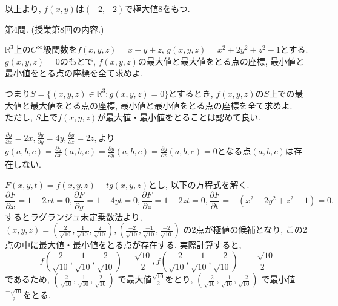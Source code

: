 \documentclass[dvipdfmx,a4paper,11pt]{article}
\newcommand{\R}{\mathbb{R}}
\theoremstyle{definition}
\newcommand{\pdrv}[2]{\frac{\partial #1}{\partial #2}}
\begin{document}
以上より,  $f(x,y)$は$(-2,-2)$で極大値$8$をもつ.
   
       \vspace{33pt}
{\Large 第4問.} (授業第8回の内容.)
    \vspace{11pt}

$\R^3$上の$C^{\infty}$級関数を$f(x,y,z) = x+y+z$, $g(x,y,z) = x^2+2y^2+z^{2}-1$とする. \\ 
$g(x,y,z)=0$のもとで, $f(x,y,z)$の最大値と最大値をとる点の座標, 最小値と最小値をとる点の座標を全て求めよ. \\

    \vspace{-11pt}
    
つまり$S = \{ (x,y,z) \in \R^3: g(x,y,z)=0\}$とするとき, 
$f(x,y,z)$の$S$上での最大値と最大値をとる点の座標, 最小値と最小値をとる点の座標を全て求めよ.　\\

   \vspace{-11pt}
 ただし, $S$上で$f(x,y,z)$が最大値・最小値をとることは認めて良い.
 
  \vspace{11pt}
 
\hspace{-11pt}{\Large $\bullet$ 第4問解答例}
  
 $\pdrv{g}{x}=2x, \pdrv{g}{y}=4y, \pdrv{g}{z}=2z, $より
 $g(a,b,c)=\pdrv{g}{x}(a,b,c)=\pdrv{g}{y}(a,b,c)=\pdrv{g}{z}(a,b,c)=0$となる点$(a,b,c)$は存在しない.
   
$F(x,y,t) = f(x,y,z)-tg(x,y,z)$とし, 以下の方程式を解く.
$$
\pdrv{F}{x} = 1-2xt=0,
\pdrv{F}{y}= 1-4yt =0,
\pdrv{F}{z}=1-2zt=0,
\pdrv{F}{t} =-(x^2+2y^2+z^2-1)=0.
$$ 
するとラグランジュ未定乗数法より, 
$(x,y,z) =(\frac{2}{\sqrt{10}} ,  \frac{1}{\sqrt{10}} ,\frac{2}{\sqrt{10}}  ), 
(\frac{-2}{\sqrt{10}} ,  \frac{-1}{\sqrt{10}} ,\frac{-2}{\sqrt{10}}  )$
の2点が極値の候補となり, 
この2点の中に最大値・最小値をとる点が存在する.
実際計算すると, 
$$
f(\frac{2}{\sqrt{10}} ,  \frac{1}{\sqrt{10}} ,\frac{2}{\sqrt{10}}  )=\frac{\sqrt{10}}{2}, 
f(\frac{-2}{\sqrt{10}} ,  \frac{-1}{\sqrt{10}} ,\frac{-2}{\sqrt{10}}  )=\frac{-\sqrt{10}}{2}
$$
であるため, 
$
(\frac{2}{\sqrt{10}} ,  \frac{1}{\sqrt{10}} ,\frac{2}{\sqrt{10}})$
で最大値$\frac{\sqrt{10}}{2}$をとり, 
$
(\frac{-2}{\sqrt{10}} ,  \frac{-1}{\sqrt{10}} ,\frac{-2}{\sqrt{10}})
$
で最小値$\frac{-\sqrt{10}}{2}$をとる.

 
\end{document}
